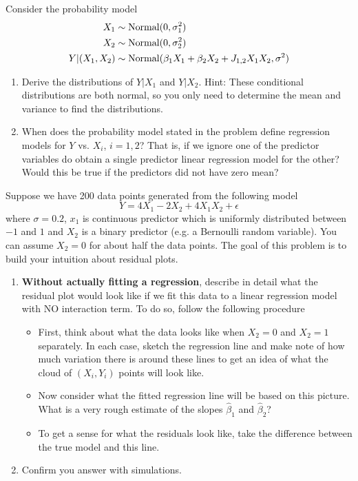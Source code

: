 \begin{exercise}
Consider the probability model 
\begin{align*}
X_1 &\sim {\rm Normal}(0,\sigma_1^2)\\
X_2 &\sim {\rm Normal}(0,\sigma_2^2)\\
Y|(X_1,X_2) &\sim {\rm Normal}(\beta_1 X_1 + \beta_2 X_2 + J_{1,2}X_1X_2,\sigma^2)
\end{align*}
\begin{enumerate}[label=(\alph*)]
\item Derive the distributions of $Y|X_1$ and $Y|X_2$. Hint: These conditional distributions are both normal, so you only need to determine the mean and variance to find the distributions. 
\item When does the probability model stated in the problem define regression models for $Y$ vs. $X_i$, $i=1,2$? That is, if we ignore one of the predictor variables do obtain a single predictor linear regression model for the other?Would this be true if the predictors did not have zero mean?
\end{enumerate}

\end{exercise}


\begin{exercise}
Suppose we have 200 data points generated from the following model
\begin{equation}
Y = 4X_1 - 2X_2 + 4X_1 X_2 + \epsilon
\end{equation}
where $\sigma = 0.2$, $x_1$ is continuous predictor which is uniformly distributed between $-1$ and $1$ and $X_2$ is a binary predictor (e.g. a Bernoulli random variable). You can assume $X_2=0$ for about half the data points. The goal of this problem is to build your intuition about residual plots. 
\begin{enumerate}[label=(\alph*)]
\item  {\bf Without actually fitting a regression}, describe in detail what the residual plot would look like if we fit this data to a linear regression model with NO interaction term. To do so, follow the following procedure 
\begin{itemize}
\item First, think about what the data looks like when $X_2=0$ and $X_2=1$ separately. In each case, sketch the regression line and make note of how much variation there is around these lines to get an idea of what the cloud of $(X_i,Y_i)$ points will look like.  
\item Now consider what the fitted regression line will be based on this picture.  What is a very rough estimate of the slopes $\hat{\beta}_1$ and $\hat{\beta}_2$?
\item To get a sense for what the residuals look like, take the difference between the true model and this line.
\end{itemize}
\item Confirm you answer with simulations. 
\end{enumerate}
\end{exercise}


